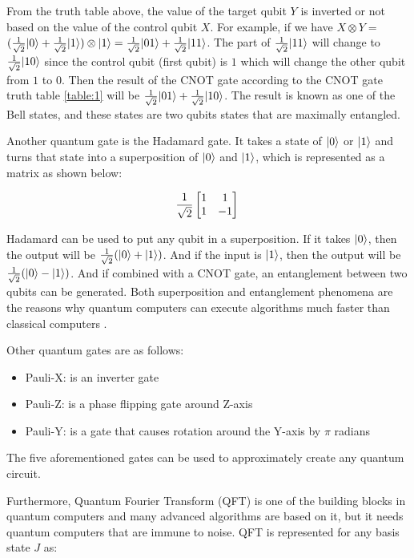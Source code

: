 \documentclass[12pt,a4paper]{article}
\DeclarePairedDelimiter\ket{\lvert}{\rangle}
\begin{document}
	From the truth table above, the value of the target qubit $Y$ is inverted or not based on the value of the control qubit $X$. For example, if we have $X \otimes Y =$ $ (\frac{1}{\sqrt2}\ket{0} + \frac{1}{\sqrt2}\ket{1}) \otimes \ket{1} = \frac{1}{\sqrt2}\ket{01} + \frac{1}{\sqrt2}\ket{11}$. The part of $\frac{1}{\sqrt2}\ket{11}$ will change to $\frac{1}{\sqrt2}\ket{10}$ since the control qubit (first qubit) is $1$ which will change the other qubit from $1$ to $0$. Then the result of the CNOT gate according to the CNOT gate truth table \ref{table:1} will be $ \frac{1}{\sqrt2}\ket{01} + \frac{1}{\sqrt2}\ket{10}$. The result is known as one of the Bell states, and these states are two qubits states that are maximally entangled.
	
	Another quantum gate is the Hadamard gate. It takes a state of $\ket{0}$ or $\ket{1}$ and turns that state into a superposition of $\ket{0}$ and $\ket{1}$, which is represented as a matrix as shown below:
	
	\begin{equation}
		\label{eqn:equation1}
		\frac{1}{\sqrt{2}} \begin{bmatrix*}
			1 & 1\\ 1 & -1
		\end{bmatrix*}\\
	\end{equation}
	
	Hadamard can be used to put any qubit in a superposition. If it takes $\ket{0}$, then the output will be 
	$\frac{1}{\sqrt{2}} (\ket{0} +\ket{1})$. And if the input is $\ket{1}$, then the output will be $\frac{1}{\sqrt{2}} (\ket{0} -\ket{1})$. And if combined with a CNOT gate, an entanglement between two qubits can be generated. Both superposition and entanglement phenomena are the reasons why quantum computers can execute algorithms much faster than classical computers \cite{9357505}.
	
	Other quantum gates are as follows:
	\begin{itemize}
		\item Pauli-X: is an inverter gate
		\item Pauli-Z: is a phase flipping gate around Z-axis
		\item Pauli-Y: is a gate that causes rotation around the Y-axis by $\pi$ radians
	\end{itemize}
	The five aforementioned gates can be used to approximately create any quantum circuit. 
	
	Furthermore, Quantum Fourier Transform (QFT) is one of the building blocks in quantum computers and many advanced algorithms are based on it, but it needs quantum computers that are immune to noise. QFT is represented for any basis state $J$ as:
	
\end{document}
